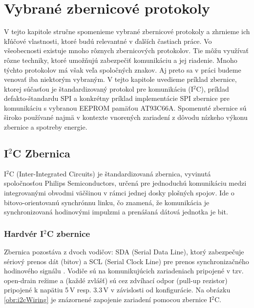 \chapter{Vybrané zbernicové protokoly}
\label{kap:zbernice}

V tejto kapitole stručne spomenieme vybrané zbernicové protokoly a zhrnieme ich kľúčové vlastnosti, ktoré budú relevantné v ďalších častiach práce. Vo všeobecnosti existuje mnoho rôznych zbernicových protokolov. Tie môžu využívať rôzne techniky, ktoré umožňujú zabezpečiť komunikáciu a jej riadenie. Mnoho týchto protokolov má však veľa spoločných znakov. Aj preto sa v práci budeme venovať iba niektorým vybraným. V tejto kapitole uvedieme príklad zbernice, ktorej súčasťou je štandardizovaný protokol pre komunikáciu (I$^2$C), príklad defakto-štandardu SPI a konkrétny príklad implementácie SPI zbernice pre komunikáciu s vybranou EEPROM pamäťou AT93C66A. Spomenuté zbernice sú široko používané najmä v kontexte vnorených zariadení z dôvodu nízkeho výkonu zbernice a spotreby energie.

\section{I$^2$C Zbernica}
I$^2$C (Inter-Integrated Circuits) je štandardizovaná zbernica, vyvinutá spoločnosťou Philips Semiconductors, určená pre jednoduchú komunikáciu medzi integrovanými obvodmi \cite{i2cSpec} väčšinou v rámci jednej dosky plošných spojov. Ide o bitovo-orientovanú synchrónnu linku, čo znamená, že komunikácia je synchronizovaná hodinovými impulzmi a prenášaná dátová jednotka je bit.

\subsection{Hardvér I$^2$C zbernice}
Zbernica pozostáva z dvoch vodičov: SDA (Serial Data Line), ktorý zabezpečuje sériový prenos dát (bitov) a SCL (Serial Clock Line) pre prenos synchronizačného hodinového signálu \cite{i2cSpec}. Vodiče sú na komunikujúcich zariadeniach pripojené v tzv. open-drain režime a (každé zvlášť) sú cez zdvíhací odpor (pull-up rezistor) pripojené k napätiu 5\,V resp. 3.3\,V v závislosti od konfigurácie. Na obrázku \ref{obr:i2cWiring} je znázornené zapojenie zariadení pomocou zbernice I$^2$C.

